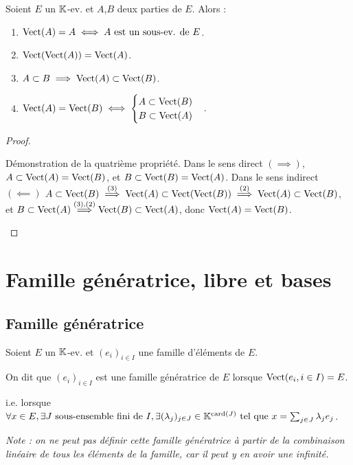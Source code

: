 \documentclass[12pt, a4paper]{report}
\begin{document}
\begin{property}
    Soient $E$ un $\mathbb{K}$-ev. et $A$,$B$ deux parties de $E$. Alors :
    \begin{enumerate}
        \item $\mathrm{Vect}(A) = A \iff A \text{ est un sous-ev. de } E$.
        \item $\mathrm{Vect}(\mathrm{Vect}(A)) = \mathrm{Vect}(A)$.
        \item $A \subset B \implies \mathrm{Vect}(A) \subset \mathrm{Vect}(B)$.
        \item $\mathrm{Vect}(A) = \mathrm{Vect}(B) \iff \begin{cases}
        A \subset \mathrm{Vect}(B)\\
        B \subset \mathrm{Vect}(A)
        \end{cases}$.
    \end{enumerate}
\end{property}

\begin{proof}
    \begin{outline}
        \1 Démonstration de la quatrième propriété.
            \2 Dans le sens direct $(\implies)$, $A \subset \mathrm{Vect}(A) = \mathrm{Vect}(B)$, et $B \subset \mathrm{Vect}(B) = \mathrm{Vect}(A)$.
            \2 Dans le sens indirect $(\impliedby)$
                \3 $A \subset \mathrm{Vect}(B) \overset{\text{(3)}}\implies \mathrm{Vect}(A) \subset \mathrm{Vect}(\mathrm{Vect}(B)) \overset{\text{(2)}}\implies \mathrm{Vect}(A) \subset \mathrm{Vect}(B)$,
                \3 et $B \subset \mathrm{Vect}(A) \overset{\text{(3),(2)}}\implies \mathrm{Vect}(B) \subset \mathrm{Vect}(A)$, donc $\mathrm{Vect}(A) = \mathrm{Vect}(B)$.
    \end{outline}
\end{proof}

\chapter{Famille génératrice, libre et bases}

\section{Famille génératrice}

\begin{definition}
    Soient $E$ un $\mathbb{K}$-ev. et $(e_i)_{i \in I}$ une famille d'éléments de $E$.

    On dit que $(e_i)_{i \in I}$ est une famille génératrice de $E$ lorsque $\mathrm{Vect}(e_i, i \in I) = E$.

    i.e. lorsque $\forall x \in E, \exists J \text{ sous-ensemble fini de } I, \exists (\lambda_j)_{j \in J} \in \mathbb{K}^{\mathrm{card}\left(J\right)} \text{ tel que } x = \sum_{j \in J} \lambda_j e_j$.

    \textit{Note : on ne peut pas définir cette famille génératrice à partir de la combinaison linéaire de tous les éléments de la famille, car il peut y en avoir une infinité.}
\end{definition}
\end{document}
